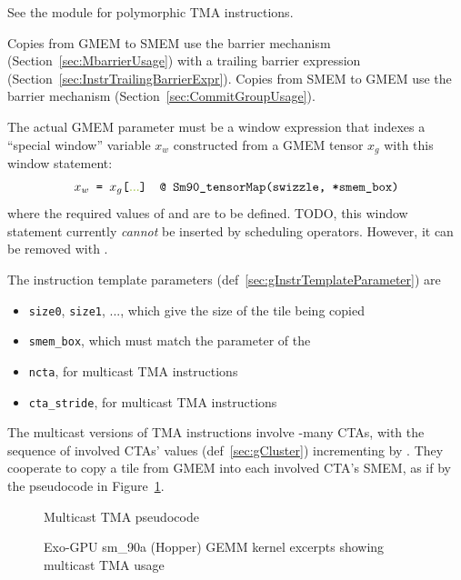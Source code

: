 
See the  module for polymorphic TMA instructions.

Copies from GMEM to SMEM use the  barrier mechanism (Section~\ref{sec:MbarrierUsage}) with a trailing barrier expression (Section~\ref{sec:InstrTrailingBarrierExpr}).
Copies from SMEM to GMEM use the  barrier mechanism (Section~\ref{sec:CommitGroupUsage}).

The actual GMEM parameter must be a window expression that indexes a ``special window'' variable $x_w$ constructed from a GMEM tensor $x_g$ with this window statement:
\begin{gather*}
    \blacktt{$x_w$ = $x_g$[\codecomment{...}] @ Sm90\_tensorMap(swizzle, *smem\_box)}
\end{gather*}
where the required values of  and  are to be defined.
TODO, this window statement currently \emph{cannot} be inserted by scheduling operators.
However, it can be removed with .

The instruction template parameters (def~\ref{sec:gInstrTemplateParameter}) are
\begin{itemize}
  \item \texttt{size0}, \texttt{size1}, ..., which give the size of the tile being copied
  \item \texttt{smem\_box}, which must match the  parameter of the 
  \item \texttt{ncta}, for multicast TMA instructions
  \item \texttt{cta\_stride}, for multicast TMA instructions
\end{itemize}
The multicast versions of TMA instructions involve -many CTAs, with the sequence of involved CTAs'  values (def~\ref{sec:gCluster}) incrementing by .
They cooperate to copy a tile from GMEM into each involved CTA's SMEM, as if by the pseudocode in Figure~\ref{fig:multicast_pseudocode}.

\begin{figure}[h!]
\codehrule

\caption{Multicast TMA pseudocode}
\label{fig:multicast_pseudocode}
\codehrule
\end{figure}
\begin{figure}[t!]
\codehrule

\caption{Exo-GPU sm\_90a (Hopper) GEMM kernel excerpts showing multicast TMA usage}
\label{fig:multicast_tma_excerpt}
\codehrule
\end{figure}

